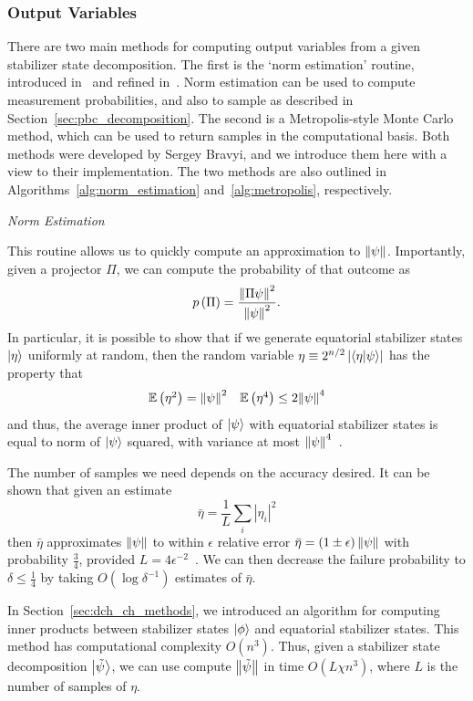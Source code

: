 \subsubsection*{Output Variables}
There are two main methods for computing output variables from a given stabilizer state decomposition. The first is the `norm estimation' routine, introduced in~\cite{Bravyi2016} and refined in~\cite{Bravyi2018}. Norm estimation can be used to compute measurement probabilities, and also to sample as described in Section~\ref{sec:pbc_decomposition}. The second is a Metropolis-style Monte Carlo method, which can be used to return samples in the computational basis. Both methods were developed by Sergey Bravyi, and we introduce them here with a view to their implementation. The two methods are also outlined in Algorithms~\ref{alg:norm_estimation} and~\ref{alg:metropolis}, respectively.\par
\large{\itshape{Norm Estimation}}\par
This routine allows us to quickly compute an approximation to $\norm{\psi}$. Importantly, given a projector $\Pi$, we can compute the probability of that outcome as
\begin{equation}
p\left(\Pi\right) = \frac{\norm{\Pi \psi}^{2}}{\norm{\psi}^{2}}.
\end{equation}
In particular, it is possible to show that if we generate equatorial stabilizer states $\ket{\eta}$ uniformly at random, then the random variable $\eta\equiv 2^{n/2}\left|\braket{\eta}{\psi}\right|$ has the property that
\[
\begin{array}{l r}
\mathbb{E}\left(\eta^{2}\right) = \norm{\psi}^{2} & \mathbb{E}\left(\eta^{4}\right) \leq 2\norm{\psi}^{4}
\end{array}
\]
and thus, the average inner product of $\ket{\psi}$ with equatorial stabilizer states is equal to norm of $\ket{\psi}$ squared, with variance at most $\norm{\psi}^{4}$~\cite{Bravyi2018}.\par
The number of samples we need depends on the accuracy desired. It can be shown that given an estimate 
\[\bar{\eta}=\frac{1}{L}\sum_{i}\left|\eta_{i}\right|^{2}\]
then $\bar{\eta}$ approximates $\norm{\psi}$ to within $\epsilon$ relative error $\bar{\eta}=\left(1\pm \epsilon\right)\norm{\psi}$ with probability $\frac{3}{4}$, provided $L=4\epsilon^{-2}$~\cite{Bravyi2018}. We can then decrease the failure probability to $\delta\leq \frac{1}{4}$ by taking $O\left(\log{\delta^{-1}}\right)$ estimates of $\bar{\eta}$.\par
In Section~\ref{sec:dch_ch_methods}, we introduced an algorithm for computing inner products between stabilizer states $\ket{\phi}$ and equatorial stabilizer states. This method has computational complexity $O(n^{3})$. Thus, given a stabilizer state decomposition $\ket{\tilde{\psi}}$, we can use compute $\norm{\tilde{\psi}}$ in time $O(L\chi n^{3})$, where $L$ is the number of samples of $\eta$.\par
